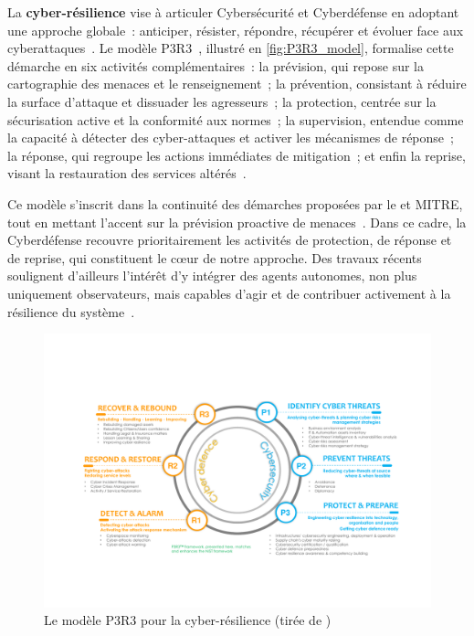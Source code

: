 La \textbf{cyber-résilience} vise à articuler Cybersécurité et Cyberdéfense en adoptant une approche globale~: anticiper, résister, répondre, récupérer et évoluer face aux cyberattaques~\cite{NISTresilience}. Le modèle P3R3~\cite{Theron2013P3R3}, illustré en \autoref{fig:P3R3_model}, formalise cette démarche en six activités complémentaires~: la prévision, qui repose sur la cartographie des menaces et le renseignement~; la prévention, consistant à réduire la surface d'attaque et dissuader les agresseurs~; la protection, centrée sur la sécurisation active et la conformité aux normes~; la supervision, entendue comme la capacité à détecter des cyber-attaques et activer les mécanismes de réponse~; la réponse, qui regroupe les actions immédiates de mitigation~; et enfin la reprise, visant la restauration des services altérés~\cite{Theron2013P3R3}.

Ce modèle s'inscrit dans la continuité des démarches proposées par le  et MITRE, tout en mettant l'accent sur la prévision proactive de menaces~\cite{Theron2013P3R3}. Dans ce cadre, la Cyberdéfense recouvre prioritairement les activités de protection, de réponse et de reprise, qui constituent le cœur de notre approche. Des travaux récents soulignent d'ailleurs l'intérêt d'y intégrer des agents autonomes, non plus uniquement observateurs, mais capables d'agir et de contribuer activement à la résilience du système~\cite{Kott2023}.

\begin{figure}[h]
  \centering
  \includegraphics[width=\linewidth]{figures/P3R3.pdf}
  \caption{Le modèle P3R3 pour la cyber-résilience (tirée de \autocite{Kott2023})}
  \label{fig:P3R3_model}
\end{figure}

